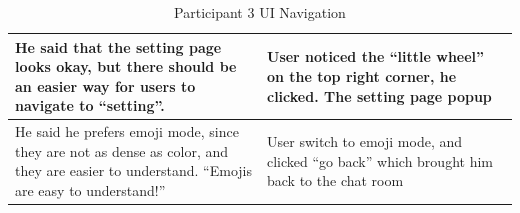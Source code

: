 \documentclass[acmsmall,screen,authorversion,nonacm]{acmart}
\begin{document}
\begin{table}[H]
\begin{tabular}{|p{0.5 \linewidth}|p{0.5 \linewidth}|}
He said that the setting page looks okay, but there should be an easier way for users to navigate to “setting”.                                                                                                        & User noticed the “little wheel” on the top right corner, he clicked. The setting page popup \\ \hline
He said he prefers emoji mode, since they are not as dense as color, and they are easier to understand. “Emojis are easy to understand!”                                                                               & User switch to emoji mode, and clicked “go back” which brought him back to the chat room    \\ \hline
\end{tabular}
\caption{Participant 3 UI Navigation}
\label{tab:SimpUser3Task1}
\end{table}
\end{document}

